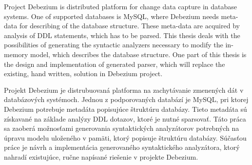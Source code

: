  
	\abstractpage
    

	Project Debezium is distributed platform for change data capture in database systems. One of supported databases is MySQL, where Debezium needs meta-data for describing of the database structure. These meta-data are acquired by analysis of DDL statements, which has to be parsed. This thesis deals with the possibilities of generating the syntactic analyzers necessary to modify the in-memory model, which describes the database structure. One part of this thesis is the design and implementation of generated parser, which will replace the existing, hand written, solution in Debezium project.

	\baselineskip

	\noindent
    Projekt Debezium je distrubuovaná platforma na zachytávanie zmenených dát v databázových systémoch. Jednou z podporovaných databází je MySQL, pri ktorej Debezium potrebuje metadáta popisujúce štruktúru databázy. Tieto metadáta sú získavané na základe analýzy DDL dotazov, ktoré je nutné sparsovať. Táto práca sa zaoberá možnosťami generovania syntaktických analyzátorov potrebných na úpravu modelu uloženého v pamäti, ktorý popisuje štruktúru databázy. Súčasťou práce je návrh a implementácia generovaného syntaktického analyzátora, ktorý nahradí existujúce, ručne napísané riešenie v projekte Debezium.
   
